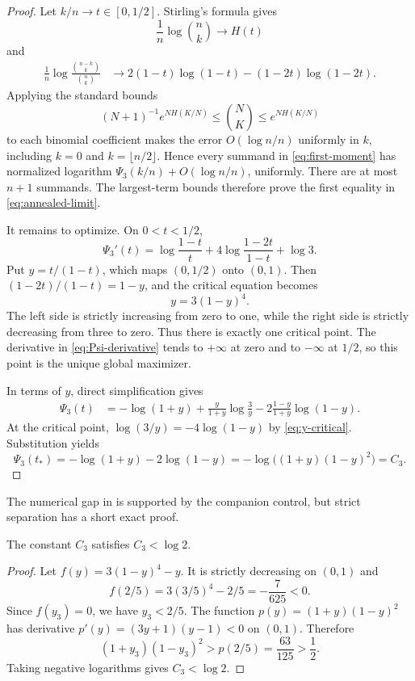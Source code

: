 \begin{proof}
Let $k/n\to t\in[0,1/2]$.  Stirling's formula gives
\[
 \frac1n\log\binom nk\longrightarrow H(t)
\]
and
\begin{align*}
 \frac1n\log\frac{\binom{n-k}{k}}{\binom nk}
 &\longrightarrow
 2(1-t)\log(1-t)-(1-2t)\log(1-2t).
\end{align*}
Applying the standard bounds
\[
 (N+1)^{-1}e^{NH(K/N)}\le\binom NK\le e^{NH(K/N)}
\]
to each binomial coefficient makes the error $O(\log n/n)$ uniformly in
$k$, including $k=0$ and $k=\lfloor n/2\rfloor$.  Hence every summand in
\eqref{eq:first-moment} has normalized logarithm
$\Psi_3(k/n)+O(\log n/n)$, uniformly.  There are at most $n+1$ summands.
The largest-term bounds therefore prove the first equality in
\eqref{eq:annealed-limit}.

It remains to optimize.  On $0<t<1/2$,
\begin{equation}\label{eq:Psi-derivative}
 \Psi_3'(t)
 =\log\frac{1-t}{t}
 +4\log\frac{1-2t}{1-t}+\log3.
\end{equation}
Put $y=t/(1-t)$, which maps $(0,1/2)$ onto $(0,1)$.  Then
$(1-2t)/(1-t)=1-y$, and the critical equation becomes
\begin{equation}\label{eq:y-critical}
 y=3(1-y)^4.
\end{equation}
The left side is strictly increasing from zero to one, while the right side
is strictly decreasing from three to zero.  Thus there is exactly one
critical point.  The derivative in \eqref{eq:Psi-derivative} tends to
$+\infty$ at zero and to $-\infty$ at $1/2$, so this point is the unique
global maximizer.

In terms of $y$, direct simplification gives
\begin{align*}
 \Psi_3(t)
 &=-\log(1+y)
 +\frac{y}{1+y}\log\frac3y
 -2\frac{1-y}{1+y}\log(1-y).
\end{align*}
At the critical point,
$\log(3/y)=-4\log(1-y)$ by \eqref{eq:y-critical}.  Substitution yields
\[
 \Psi_3(t_*)=-\log(1+y)-2\log(1-y)
 =-\log\bigl((1+y)(1-y)^2\bigr)=C_3.
\]
\end{proof}

The numerical gap in  is supported by the companion control,
but strict separation has a short exact proof.

\begin{lemma}\label{lem:strict-gap}
The constant $C_3$ satisfies $C_3<\log2$.
\end{lemma}

\begin{proof}
Let $f(y)=3(1-y)^4-y$.  It is strictly decreasing on $(0,1)$ and
\[
 f(2/5)=3(3/5)^4-2/5=-\frac7{625}<0.
\]
Since $f(y_3)=0$, we have $y_3<2/5$.  The function
$p(y)=(1+y)(1-y)^2$ has derivative
$p'(y)=(3y+1)(y-1)<0$ on $(0,1)$.  Therefore
\[
 (1+y_3)(1-y_3)^2>p(2/5)=\frac{63}{125}>\frac12.
\]
Taking negative logarithms gives $C_3<\log2$.
\end{proof}

